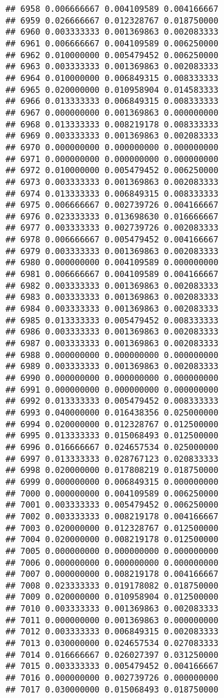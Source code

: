 \documentclass[
]{article}
\begin{document}
\begin{verbatim}
## 6958 0.006666667 0.004109589 0.004166667
## 6959 0.026666667 0.012328767 0.018750000
## 6960 0.003333333 0.001369863 0.002083333
## 6961 0.006666667 0.004109589 0.006250000
## 6962 0.010000000 0.005479452 0.006250000
## 6963 0.003333333 0.001369863 0.002083333
## 6964 0.010000000 0.006849315 0.008333333
## 6965 0.020000000 0.010958904 0.014583333
## 6966 0.013333333 0.006849315 0.008333333
## 6967 0.000000000 0.001369863 0.000000000
## 6968 0.013333333 0.008219178 0.008333333
## 6969 0.003333333 0.001369863 0.002083333
## 6970 0.000000000 0.000000000 0.000000000
## 6971 0.000000000 0.000000000 0.000000000
## 6972 0.010000000 0.005479452 0.006250000
## 6973 0.003333333 0.001369863 0.002083333
## 6974 0.013333333 0.006849315 0.008333333
## 6975 0.006666667 0.002739726 0.004166667
## 6976 0.023333333 0.013698630 0.016666667
## 6977 0.003333333 0.002739726 0.002083333
## 6978 0.006666667 0.005479452 0.004166667
## 6979 0.003333333 0.001369863 0.002083333
## 6980 0.000000000 0.004109589 0.000000000
## 6981 0.006666667 0.004109589 0.004166667
## 6982 0.003333333 0.001369863 0.002083333
## 6983 0.003333333 0.001369863 0.002083333
## 6984 0.003333333 0.001369863 0.002083333
## 6985 0.013333333 0.005479452 0.008333333
## 6986 0.003333333 0.001369863 0.002083333
## 6987 0.003333333 0.001369863 0.002083333
## 6988 0.000000000 0.000000000 0.000000000
## 6989 0.003333333 0.001369863 0.002083333
## 6990 0.000000000 0.000000000 0.000000000
## 6991 0.000000000 0.000000000 0.000000000
## 6992 0.013333333 0.005479452 0.008333333
## 6993 0.040000000 0.016438356 0.025000000
## 6994 0.020000000 0.012328767 0.012500000
## 6995 0.013333333 0.015068493 0.012500000
## 6996 0.016666667 0.024657534 0.025000000
## 6997 0.013333333 0.028767123 0.020833333
## 6998 0.020000000 0.017808219 0.018750000
## 6999 0.000000000 0.006849315 0.000000000
## 7000 0.000000000 0.004109589 0.006250000
## 7001 0.003333333 0.005479452 0.006250000
## 7002 0.003333333 0.008219178 0.004166667
## 7003 0.020000000 0.012328767 0.012500000
## 7004 0.020000000 0.008219178 0.012500000
## 7005 0.000000000 0.000000000 0.000000000
## 7006 0.000000000 0.000000000 0.000000000
## 7007 0.000000000 0.008219178 0.004166667
## 7008 0.023333333 0.019178082 0.018750000
## 7009 0.020000000 0.010958904 0.012500000
## 7010 0.003333333 0.001369863 0.002083333
## 7011 0.000000000 0.001369863 0.000000000
## 7012 0.003333333 0.006849315 0.002083333
## 7013 0.030000000 0.024657534 0.027083333
## 7014 0.016666667 0.026027397 0.031250000
## 7015 0.003333333 0.005479452 0.004166667
## 7016 0.000000000 0.002739726 0.000000000
## 7017 0.030000000 0.015068493 0.018750000

\end{verbatim}
\end{document}
